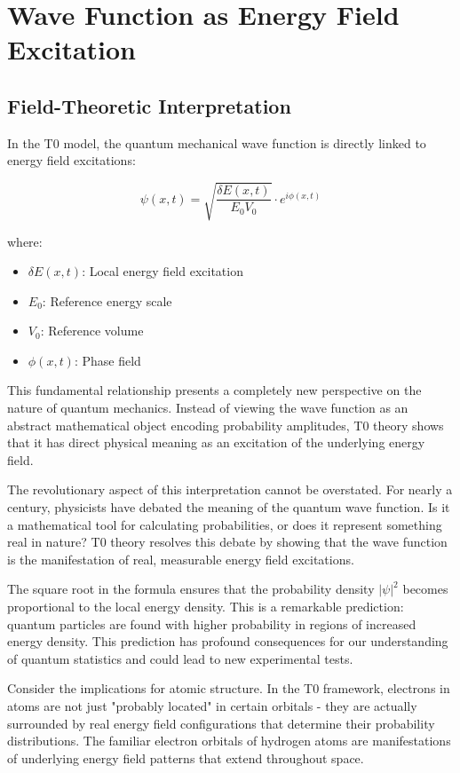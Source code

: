 \documentclass[12pt,a4paper]{article}
\newcommand{\deltaE}{\delta E}
\theoremstyle{definition}
\theoremstyle{remark}
\begin{document}
\section{Wave Function as Energy Field Excitation}

\subsection{Field-Theoretic Interpretation}

In the T0 model, the quantum mechanical wave function is directly linked to energy field excitations:

\begin{equation}
	\boxed{\psi(x,t) = \sqrt{\frac{\deltaE(x,t)}{E_0 V_0}} \cdot e^{i\phi(x,t)}}
	\label{eq:wavefunction_field}
\end{equation}

where:
\begin{itemize}
	\item $\deltaE(x,t)$: Local energy field excitation
	\item $E_0$: Reference energy scale
	\item $V_0$: Reference volume
	\item $\phi(x,t)$: Phase field
\end{itemize}

This fundamental relationship presents a completely new perspective on the nature of quantum mechanics. Instead of viewing the wave function as an abstract mathematical object encoding probability amplitudes, T0 theory shows that it has direct physical meaning as an excitation of the underlying energy field.

The revolutionary aspect of this interpretation cannot be overstated. For nearly a century, physicists have debated the meaning of the quantum wave function. Is it a mathematical tool for calculating probabilities, or does it represent something real in nature? T0 theory resolves this debate by showing that the wave function is the manifestation of real, measurable energy field excitations.

The square root in the formula ensures that the probability density $|\psi|^2$ becomes proportional to the local energy density. This is a remarkable prediction: quantum particles are found with higher probability in regions of increased energy density. This prediction has profound consequences for our understanding of quantum statistics and could lead to new experimental tests.

Consider the implications for atomic structure. In the T0 framework, electrons in atoms are not just "probably located" in certain orbitals - they are actually surrounded by real energy field configurations that determine their probability distributions. The familiar electron orbitals of hydrogen atoms are manifestations of underlying energy field patterns that extend throughout space.
\end{document}
